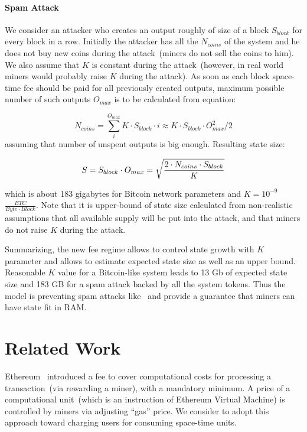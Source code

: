 \documentclass[]{llncs}   %
\newcommand{\state}{state}
\begin{document}
\paragraph{Spam Attack}

We consider an attacker who creates an output roughly of size of a block $S_{block}$ for every block in a row. Initially the attacker has all the $N_{coins}$ of the system and he does not buy new coins during the attack~(miners do not sell the coins to him). We also assume that $K$ is constant during the attack~(however, in real world miners would probably raise $K$ during the attack). As soon as each block space-time fee should be paid for all previously created outputs, maximum possible number of such outputs $O_{max}$ is to be calculated from equation:

\begin{equation}
N_{coins} = \sum_i^{O_{max}}{K \cdot S_{block} \cdot i} \approx K \cdot S_{block} \cdot O_{max}^2 / 2
\end{equation}
assuming that number of unspent outputs is big enough. Resulting state size: 

\begin{equation}
\label{eq:statesizemax}
S = S_{block} \cdot O_{max} = \sqrt { 2 \cdot N_{coins} \cdot S_{block} \over K}
\end{equation}

which is about 183 gigabytes for Bitcoin network parameters and $K=10^{-9}$ $\frac{BTC}{Byte \cdot Block}$. 
Note that it is upper-bound of \state{} size calculated from non-realistic assumptions that all available supply will be put into the attack, and that miners do not raise $K$ during the attack.

Summarizing, the new fee regime allows to control state growth with $K$ parameter and allows to estimate expected state size as well as an upper bound. Reasonable $K$ value for a Bitcoin-like system leads to 13 Gb of expected state size and 183 GB for a spam attack backed by all the system tokens. Thus the model is preventing spam attacks like~\cite{bitcoin2015flood} and provide a guarantee that miners can have state fit in RAM.

\section{Related Work}
\label{sec:rel-work}

Ethereum~\cite{ethyp} introduced a fee to cover computational costs for processing a transaction~(via rewarding a miner), with a mandatory minimum. A price of a computational unit~(which is an instruction of Ethereum Virtual Machine) is controlled by miners via adjusting ``gas'' price. We consider to adopt this approach toward charging users for consuming space-time units.
\end{document}
